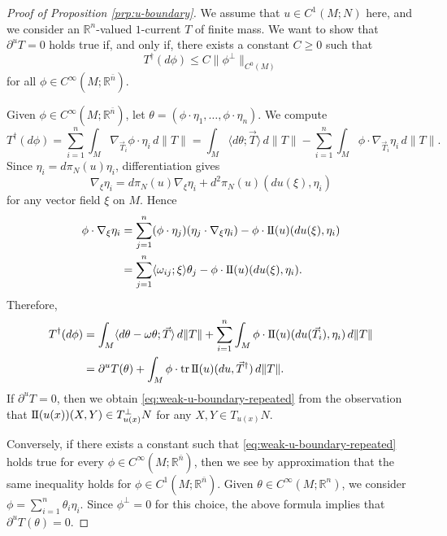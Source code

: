 \documentclass[a4paper]{article}
\newcommand{\R}{\mathbb{R}}
\newcommand{\ndim}{{\bar{n}}}
\newcommand{\sff}{\mathrm{I{\mkern -1mu}I}}
\DeclareMathOperator{\tr}{tr}
\newcommand{\pairing}[2]{\langle #1; #2 \rangle}
\theoremstyle{definition}
\theoremstyle{remark}
\begin{document}
\begin{proof}[Proof of Proposition \ref{prp:u-boundary}]
We assume that $u \in C^1(M; N)$ here, and we consider an $\R^n$-valued
$1$-current $T$ of finite mass. We want to show that $\partial^u T = 0$ holds true
if, and only if, there exists a constant $C \ge 0$ such that
\begin{equation} \label{eq:weak-u-boundary-repeated}
T^\dagger(d\phi) \le C\|\phi^\perp\|_{C^0(M)}
\end{equation}
for all $\phi \in C^\infty(M; \R^\ndim)$.

Given $\phi \in C^\infty(M; \R^\ndim)$, let $\theta = (\phi \cdot \eta_1, \dotsc, \phi \cdot \eta_n)$. We compute
\[
T^\dagger(d\phi) = \sum_{i = 1}^n \int_M \nabla_{\vec{T}_i} \phi \cdot \eta_i \, d\|T\| = \int_M \pairing{d\theta}{\vec{T}} \, d\|T\| - \sum_{i = 1}^n \int_M \phi \cdot \nabla_{\vec{T}_i} \eta_i \, d\|T\|.
\]
Since $\eta_i = d\pi_N(u) \eta_i$, differentiation gives
\[
\nabla_\xi \eta_i = d\pi_N(u) \nabla_\xi \eta_i + d^2\pi_N(u)(du(\xi), \eta_i)
\]
for any vector field $\xi$ on $M$. Hence
\[
\begin{split}
\phi \cdot \nabla_\xi \eta_i & = \sum_{j = 1}^n (\phi \cdot \eta_j) (\eta_j \cdot \nabla_\xi \eta_i) - \phi \cdot \sff(u)(du(\xi), \eta_i) \\
& = \sum_{j = 1}^n \pairing{\omega_{ij}}{\xi} \theta_j - \phi \cdot \sff(u)(du(\xi), \eta_i).
\end{split}
\]
Therefore,
\[
\begin{split}
T^\dagger(d\phi) & = \int_M \pairing{d\theta - \omega \theta}{\vec{T}} \, d\|T\| + \sum_{i = 1}^n \int_M \phi \cdot \sff(u)(du(\vec{T}_i), \eta_i) \, d\|T\| \\
& = \partial^u T(\theta) + \int_M \phi \cdot \tr \sff(u)(du, \vec{T}^\dagger) \, d\|T\|.
\end{split}
\]
If $\partial^u T = 0$, then we obtain \eqref{eq:weak-u-boundary-repeated} from the observation that $\sff(u(x))(X, Y) \in T_{u(x)}^\perp N$ for any $X, Y \in T_{u(x)} N$.

Conversely, if there exists a constant such that \eqref{eq:weak-u-boundary-repeated} holds true
for every $\phi \in C^\infty(M; \R^\ndim)$, then we see by approximation that the same inequality holds for $\phi \in C^1(M; \R^\ndim)$. Given $\theta \in C^\infty(M; \R^n)$, we consider $\phi = \sum_{i = 1}^n \theta_i \eta_i$.
Since $\phi^\perp = 0$ for this choice, the above formula implies that
$\partial^u T(\theta) = 0$.
\end{proof}
\end{document}

